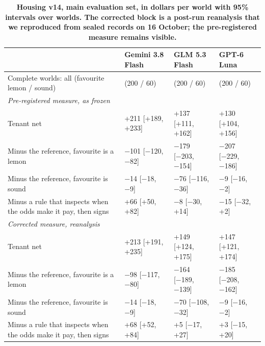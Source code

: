 \renewcommand{\thetable}{E.13}
\begin{longtable}[]{@{}
  >{\raggedright\arraybackslash}p{}
  >{\raggedleft\arraybackslash}p{}
  >{\raggedleft\arraybackslash}p{}
  >{\raggedleft\arraybackslash}p{}@{}}
\caption{\textbf{Housing v14, main evaluation set, in dollars per world with 95\% intervals over worlds. The corrected block is a post-run reanalysis that we reproduced from sealed records on 16 October; the pre-registered measure remains visible.}}\label{tab:E.13}\tabularnewline
\toprule\noalign{}
\begin{minipage}[b]{\linewidth}\raggedright
\end{minipage} & \begin{minipage}[b]{\linewidth}\raggedleft
Gemini 3.8 Flash
\end{minipage} & \begin{minipage}[b]{\linewidth}\raggedleft
GLM 5.3 Flash
\end{minipage} & \begin{minipage}[b]{\linewidth}\raggedleft
GPT-6 Luna
\end{minipage} \\
\midrule\noalign{}
\endhead
\bottomrule\noalign{}
\endlastfoot
Complete worlds: all (favourite lemon / sound) & 260 (200 / 60) & 260 (200 / 60) & 260 (200 / 60) \\
\emph{Pre-registered measure, as frozen} & & & \\
Tenant net & +211 {[}+189, +233{]} & +137 {[}+111, +162{]} & +130 {[}+104, +156{]} \\
Minus the reference, favourite is a lemon & −101 {[}−120, −82{]} & −179 {[}−203, −154{]} & −207 {[}−229, −186{]} \\
Minus the reference, favourite is sound & −14 {[}−18, −9{]} & −76 {[}−116, −36{]} & −9 {[}−16, −2{]} \\
Minus a rule that inspects when the odds make it pay, then signs & +66 {[}+50, +82{]} & −8 {[}−30, +14{]} & −15 {[}−32, +2{]} \\
\emph{Corrected measure, reanalysis} & & & \\
Tenant net & +213 {[}+191, +235{]} & +149 {[}+124, +175{]} & +147 {[}+121, +174{]} \\
Minus the reference, favourite is a lemon & −98 {[}−117, −80{]} & −164 {[}−189, −139{]} & −185 {[}−208, −162{]} \\
Minus the reference, favourite is sound & −14 {[}−18, −9{]} & −70 {[}−108, −32{]} & −9 {[}−16, −2{]} \\
Minus a rule that inspects when the odds make it pay, then signs & +68 {[}+52, +84{]} & +5 {[}−17, +27{]} & +3 {[}−15, +20{]} \\
\end{longtable}

